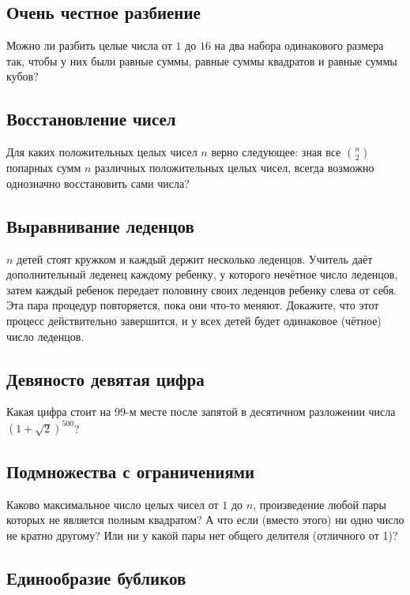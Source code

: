 \subsection*{Очень честное разбиение}

Можно ли разбить целые числа от $1$ до $16$ на два набора одинакового размера так,
чтобы у них были равные суммы, равные суммы квадратов и равные суммы кубов?

\subsection*{Восстановление чисел}
Для каких положительных целых чисел $n$ верно следующее: зная все $\binom n2$ попарных сумм $n$ различных положительных целых чисел, всегда возможно однозначно восстановить сами числа?


\subsection*{Выравнивание леденцов}

$n$ детей стоят кружком и каждый держит несколько леденцов.
Учитель даёт дополнительный леденец каждому ребенку, у которого нечётное число леденцов,
затем каждый ребенок передает половину своих леденцов ребенку слева от себя.
Эта пара процедур повторяется, пока они что-то меняют.
Докажите, что этот процесс действительно завершится, и у всех детей будет одинаковое (чётное) число леденцов.

\subsection*{Девяносто девятая цифра}

Какая цифра стоит на 99-м месте после запятой в десятичном разложении числа 
$(1+\sqrt2)^{500}$?

\subsection*{Подмножества с ограничениями}

Каково максимальное число целых чисел от $1$ до $n$, произведение любой пары которых не является полным квадратом?
А что если (вместо этого) ни одно число не кратно другому?
Или ни у какой пары нет общего делителя (отличного от 1)?

\subsection*{Единообразие бубликов}

